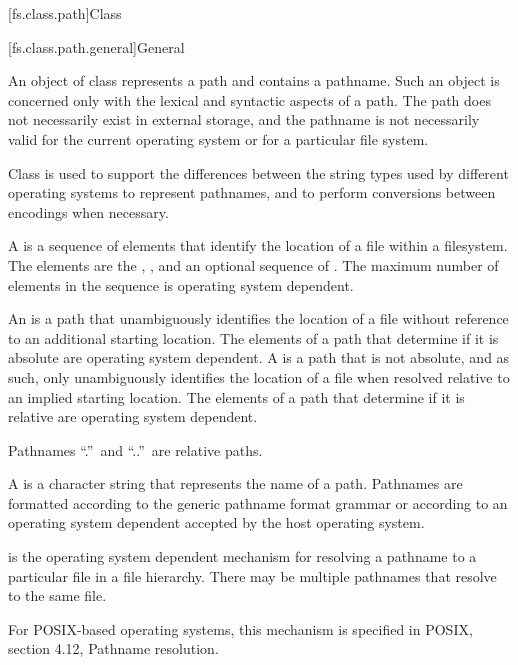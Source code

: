 [fs.class.path]{Class }

[fs.class.path.general]{General}

%
\pnum
An object of class  represents a path
and contains a pathname.
Such an object is concerned only with the lexical and syntactic aspects
of a path. The path does not necessarily exist in external storage, and the
pathname is not necessarily valid for the current operating
system or for a particular file system.

\pnum
\begin{note}
Class  is used to support the differences
between the string types used by different operating systems
to represent pathnames,
and to perform conversions between encodings when necessary.
\end{note}

\pnum
A  is
a sequence of elements that identify
the location of a file within a filesystem.
The elements are the
,
,
and an optional sequence of .
The maximum number of elements in the sequence is
operating system dependent.

\pnum
An  is a path that unambiguously
identifies the location of a file without reference to an additional starting
location. The elements of a path that determine if it is absolute are
operating system dependent.
A  is
a path that is not absolute, and as such, only unambiguously
identifies the location of a file when resolved relative to
an implied starting location. The elements of a path that determine if it is
relative are operating system dependent.
\begin{note}
Pathnames ``.''\ and ``..''\ are relative paths.
\end{note}

\pnum
A  is
a character string that represents the name of a path. Pathnames are
formatted according to the generic pathname format grammar
or according to an
operating system dependent
 accepted by the host operating system.

\pnum
{}
is the operating system dependent mechanism for resolving
a pathname to a particular file in a file hierarchy. There may be multiple
pathnames that resolve to the same file.
\begin{example}
For POSIX-based operating systems,
this mechanism is specified in POSIX, section 4.12, Pathname resolution.
\end{example}


